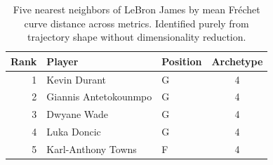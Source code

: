\begin{table}[htbp]
  \centering\small
  \begin{tabular}{rllc}
    \toprule
    Rank & Player & Position & Archetype \\
    \midrule
    1 & Kevin Durant & G & 4 \\
    2 & Giannis Antetokounmpo & G & 4 \\
    3 & Dwyane Wade & G & 4 \\
    4 & Luka Doncic & G & 4 \\
    5 & Karl-Anthony Towns & F & 4 \\
    \bottomrule
  \end{tabular}
  \caption{Five nearest neighbors of LeBron James by mean Fr\'{e}chet curve distance across metrics. Identified purely from trajectory shape without dimensionality reduction.}
  \label{tab:LeBron_James_frechet_curve_neighbors}
\end{table}

